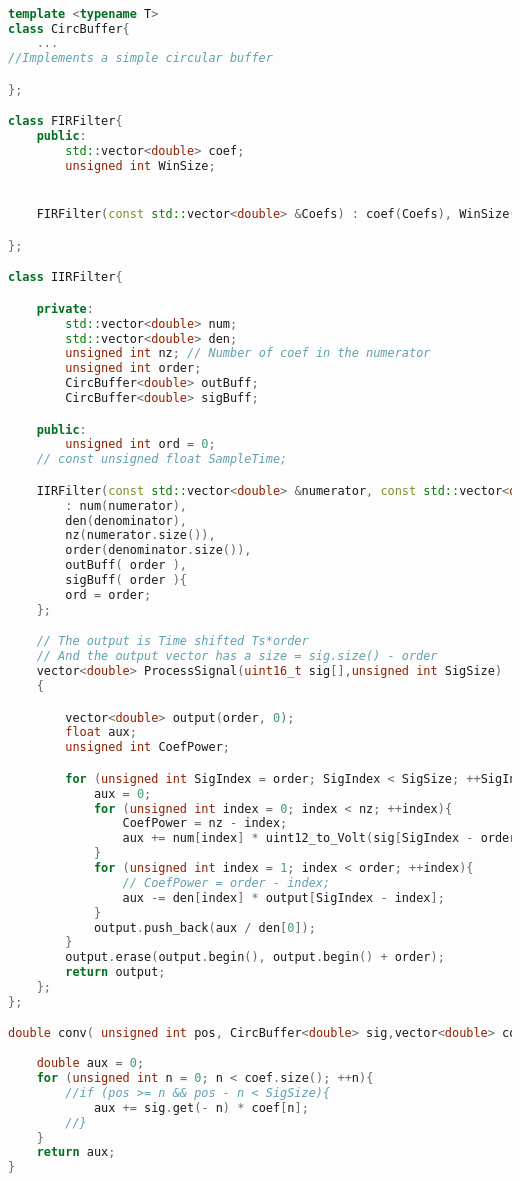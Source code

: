 \begin{lstlisting}[language=C++, caption=Filter.h]

template <typename T>
class CircBuffer{
    ...    
//Implements a simple circular buffer

};

class FIRFilter{
    public:
        std::vector<double> coef;
        unsigned int WinSize;


    FIRFilter(const std::vector<double> &Coefs) : coef(Coefs), WinSize(Coefs.size()) {}

};

class IIRFilter{

    private:
        std::vector<double> num;
        std::vector<double> den;
        unsigned int nz; // Number of coef in the numerator
        unsigned int order;
        CircBuffer<double> outBuff;
        CircBuffer<double> sigBuff;

    public:
        unsigned int ord = 0;
    // const unsigned float SampleTime;

    IIRFilter(const std::vector<double> &numerator, const std::vector<double> &denominator)
        : num(numerator),
        den(denominator),
        nz(numerator.size()),
        order(denominator.size()),
        outBuff( order ),
        sigBuff( order ){
        ord = order;
    };

    // The output is Time shifted Ts*order
    // And the output vector has a size = sig.size() - order
    vector<double> ProcessSignal(uint16_t sig[],unsigned int SigSize)
    {

        vector<double> output(order, 0);
        float aux;
        unsigned int CoefPower;

        for (unsigned int SigIndex = order; SigIndex < SigSize; ++SigIndex){
            aux = 0;
            for (unsigned int index = 0; index < nz; ++index){
                CoefPower = nz - index;
                aux += num[index] * uint12_to_Volt(sig[SigIndex - order + CoefPower]);
            }
            for (unsigned int index = 1; index < order; ++index){
                // CoefPower = order - index;
                aux -= den[index] * output[SigIndex - index];
            }
            output.push_back(aux / den[0]);
        }
        output.erase(output.begin(), output.begin() + order);
        return output;
    };
};

double conv( unsigned int pos, CircBuffer<double> sig,vector<double> coef/*, unsigned int SigSize*/ ){
    
    double aux = 0;
    for (unsigned int n = 0; n < coef.size(); ++n){
        //if (pos >= n && pos - n < SigSize){
            aux += sig.get(- n) * coef[n];
        //}
    }
    return aux;
}
\end{lstlisting}



